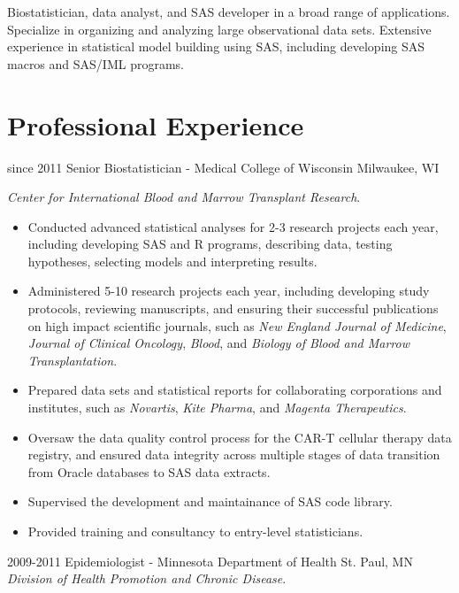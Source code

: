 Biostatistician, data analyst, and SAS developer in a broad range of applications. Specialize in organizing and analyzing large observational data sets. Extensive experience in statistical model building using SAS, including developing SAS macros and SAS/IML programs.\\

\section{Professional Experience}

\begin{entrylist}
  \entry
    {since 2011}
    {Senior Biostatistician - Medical College of Wisconsin}
    {Milwaukee, WI}
    {
    \textit{Center for International Blood and Marrow Transplant Research}.
    \begin{itemize}
      \item Conducted advanced statistical analyses for 2-3 research projects each year, including developing SAS and R programs, describing data, testing hypotheses, selecting models and interpreting results.
      \item Administered 5-10 research projects each year, including developing study protocols, reviewing manuscripts, and ensuring their successful publications on high impact scientific journals, such as \textit{New England Journal of Medicine}, \textit{Journal of Clinical Oncology}, \textit{Blood}, and \textit{Biology of Blood and Marrow Transplantation}.
      \item Prepared data sets and statistical reports for collaborating corporations and institutes, such as \textit{Novartis}, \textit{Kite Pharma}, and \textit{Magenta Therapeutics}.
      \item Oversaw the data quality control process for the CAR-T cellular therapy data registry, and ensured data integrity across multiple stages of data transition from Oracle databases to SAS data extracts.
      \item Supervised the development and maintainance of SAS code library.
      \item Provided training and consultancy to entry-level statisticians.
    \end{itemize}
    }
  \entry
    {2009-2011}
    {Epidemiologist - Minnesota Department of Health}
    {St. Paul, MN}
    {
    \textit{Division of Health Promotion and Chronic Disease}.
}
\end{entrylist}
